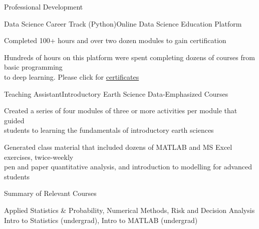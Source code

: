 \documentclass{resume} %
\begin{document}

\begin{rSection}{Professional Development} 

\begin{rSubsection}{Data Science Career Track (Python)}{}{Online Data Science Education Platform}{}
\item {Completed 100+ hours and over two dozen modules to gain certification}
\item {Hundreds of hours on this platform were spent completing dozens of courses from basic programming \\ to deep learning. Please click for \href{https://github.com/907Resident/Certifications}{certificates}}
\end{rSubsection}


\begin{rSubsection}{Teaching Assistant}{}{Introductory Earth Science Data-Emphasized Courses}{}
\item {Created a series of four modules of three or more activities per module that guided \\ students to learning the fundamentals of introductory earth sciences}
\item {Generated class material that included dozens of MATLAB and MS Excel exercises, twice-weekly \\ pen and paper quantitative analysis, and introduction to modelling for advanced students}
\end{rSubsection}


\begin{rSubsection}{Summary of Relevant Courses}{}{}{}
\item {Applied Statistics \& Probability, Numerical Methods, Risk and Decision Analysis \\ Intro to Statistics (undergrad), Intro to MATLAB (undergrad)}

\end{rSubsection}


\end{rSection} 
\end{document}
